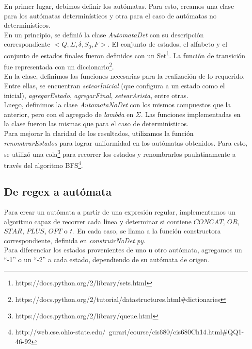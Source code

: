 \documentclass[a4paper, 10pt, twoside]{article}
\begin{document}
En primer lugar, debimos definir los autómatas. Para esto, creamos una clase para los autómatas determinísticos y otra para el caso de autómatas no determinísticos.\\
\newline
En un principio, se definió la clase \textit{AutomataDet} con su descripción correspondiente $<Q, \Sigma, \delta, S_0, F>$. El conjunto de estados, el alfabeto y el conjunto de estados finales fueron definidos con un Set\footnote{https://docs.python.org/2/library/sets.html}. La función de transición fue representada con un diccionario\footnote{https://docs.python.org/2/tutorial/datastructures.html\#dictionaries}.\\
En la clase, definimos las funciones necesarias para la realización de lo requerido. Entre ellas, se encuentran \textit{setearInicial} (que configura a un estado como el inicial), \textit{agregarEstado}, \textit{agregarFinal}, \textit{setearArista}, entre otras.\\
\newline
Luego, definimos la clase \textit{AutomataNoDet} con los mismos compuestos que la anterior, pero con el agregado de \textit{lambda} en $\Sigma$. Las funciones implementadas en la clase fueron las mismas que para el caso de determinísticos.\\
\newline
Para mejorar la claridad de los resultados, utilizamos la función \textit{renombrarEstados} para lograr uniformidad en los autómatas obtenidos. Para esto, se utilizó una cola\footnote{https://docs.python.org/2/library/queue.html} para recorrer los estados y renombrarlos paulatinamente a través del algoritmo BFS\footnote{http://web.cse.ohio-state.edu/~gurari/course/cis680/cis680Ch14.html\#QQ1-46-92}.

\subsection{De regex a autómata}
Para crear un autómata a partir de una expresión regular, implementamos un algoritmo capaz de recorrer cada línea y determinar si contiene ${CONCAT}$, ${OR}$, ${STAR}$, ${PLUS}$, ${OPT}$ o $\\t$. En cada caso, se llama a la función constructora correspondiente, definida en \textit{construirNoDet.py}.\\
\newline
Para diferenciar los estados provenientes de uno u otro autómata, agregamos un ``-1'' o un ``-2'' a cada estado, dependiendo de su autómata de origen.
\end{document}
